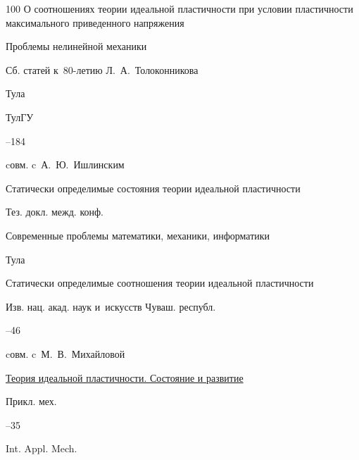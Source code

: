 \begin{thebibliography}{100}
\paper О соотношениях теории идеальной пластичности при условии пластичности максимального приведенного напряжения 

\inbook Проблемы нелинейной механики

\bookinfo Сб. статей к~80-летию Л.~А.~Толоконникова

\publaddr Тула

\publ ТулГУ


–184 

\miscnote cовм. c~А.~Ю.~Ишлинским




\paper Статически определимые состояния теории идеальной пластичности

\bookinfo Тез. докл. межд. конф. \nofrills

\inbook Современные проблемы математики, механики, информатики

\publaddr  Тула






\paper Статически определимые соотношения теории идеальной пластичности 

\jour Изв. нац. акад. наук и~искусств Чуваш. республ.



–46 

\miscnote cовм. c~М.~В.~Михайловой




\paper \href{http://elibrary.ru/item.asp?id=14981735}{Теория идеальной пластичности. Состояние и развитие}

\jour Прикл. мех.




--35



\transl

\jour Int. Appl. Mech. 



\end{thebibliography}

